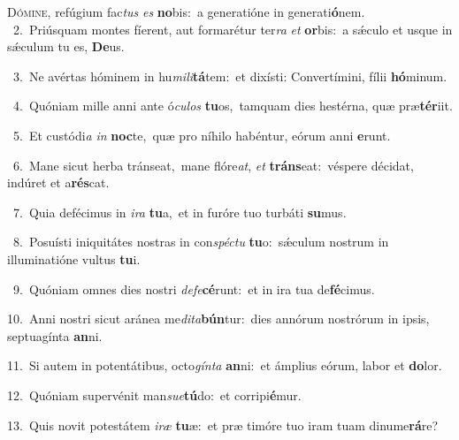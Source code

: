 \lettrine{\initial\textcolor{\initialcolor}{D}}{ómine,} refúgium fac\textit{tus} \textit{es} \textbf{no}\-bis:~\star a generatióne in generati\-\textbf{ó}\-nem.\\
{\numbfont\textcolor{\numbcolor}{~2.}}~Priúsquam montes fíerent, aut formarétur ter\textit{ra} \textit{et} \textbf{or}\-bis:~\star a sǽculo et usque in sǽculum tu es, \textbf{De}\-us.\par
{\numbfont\textcolor{\numbcolor}{~3.}}~Ne avértas hóminem in hu\-\textit{mi}\-\textit{li}\textbf{tá}tem:~\star et dixísti: Convertímini, fílii \textbf{hó}\-minum.\par
{\numbfont\textcolor{\numbcolor}{~4.}}~Quóniam mille anni ante ó\-\textit{cu}\-\textit{los} \textbf{tu}\-os,~\star tamquam dies hestérna, quæ præ\-\textbf{tér}\-iit.\par
{\numbfont\textcolor{\numbcolor}{~5.}}~Et custódi\textit{a} \textit{in} \textbf{noc}\-te,~\star quæ pro níhilo habéntur, eórum anni \textbf{e}\-runt.\par
{\numbfont\textcolor{\numbcolor}{~6.}}~Mane sicut herba tránseat,~\dagger mane flóre\-\textit{at}\-, \textit{et} \textbf{tráns}\-eat:~\star véspere décidat, indúret et a\-\textbf{rés}\-cat.\par
{\numbfont\textcolor{\numbcolor}{~7.}}~Quia defécimus in \textit{i}\-\textit{ra} \textbf{tu}\-a,~\star et in furóre tuo turbáti \textbf{su}\-mus.\par
{\numbfont\textcolor{\numbcolor}{~8.}}~Posuísti iniquitátes nostras in con\-\textit{spéc}\-\textit{tu} \textbf{tu}\-o:~\star sǽculum nostrum in illuminatióne vultus \textbf{tu}\-i.\par
{\numbfont\textcolor{\numbcolor}{~9.}}~Quóniam omnes dies nostri \textit{de}\-\textit{fe}\textbf{cé}runt:~\star et in ira tua de\-\textbf{fé}\-cimus.\par
{\numbfont\textcolor{\numbcolor}{10.}}~Anni nostri sicut aránea me\-\textit{di}\-\textit{ta}\textbf{bún}tur:~\star dies annórum nostrórum in ipsis, septuagínta \textbf{an}\-ni.\par
{\numbfont\textcolor{\numbcolor}{11.}}~Si autem in potentátibus, octo\-\textit{gín}\-\textit{ta} \textbf{an}\-ni:~\star et ámplius eórum, labor et \textbf{do}\-lor.\par
{\numbfont\textcolor{\numbcolor}{12.}}~Quóniam supervénit man\-\textit{su}\-\textit{e}\textbf{tú}do:~\star et corripi\-\textbf{é}\-mur.\par
{\numbfont\textcolor{\numbcolor}{13.}}~Quis novit potestátem \textit{i}\-\textit{ræ} \textbf{tu}\-æ:~\star et præ timóre tuo iram tuam dinume\-\textbf{rá}\-re?\par
